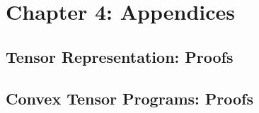
\chapter{Chapter 4: Appendices}\label{app:chapter-four}

\section{Tensor Representation: Proofs}\label{app:tensor-representation}



\section{Convex Tensor Programs: Proofs}\label{app:convex-tensor}


